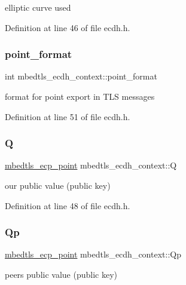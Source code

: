 elliptic curve used 

Definition at line 46 of file ecdh.\+h.

\mbox{\label{structmbedtls__ecdh__context_ae7ae7b0231e898b0d973df360aea8f17}} 
\subsubsection{\texorpdfstring{point\+\_\+format}{point\_format}}
{\footnotesize\ttfamily int mbedtls\+\_\+ecdh\+\_\+context\+::point\+\_\+format}

format for point export in T\+LS messages 

Definition at line 51 of file ecdh.\+h.

\mbox{\label{structmbedtls__ecdh__context_af2657e12e87be5b3e73bcf1ea2941d0b}} 
\subsubsection{\texorpdfstring{Q}{Q}}
{\footnotesize\ttfamily \mbox{\hyperlink{structmbedtls__ecp__point}{mbedtls\+\_\+ecp\+\_\+point}} mbedtls\+\_\+ecdh\+\_\+context\+::Q}

our public value (public key) 

Definition at line 48 of file ecdh.\+h.

\mbox{\label{structmbedtls__ecdh__context_a64ecde7d95dcc725d6af5f8e3ce542ca}} 
\subsubsection{\texorpdfstring{Qp}{Qp}}
{\footnotesize\ttfamily \mbox{\hyperlink{structmbedtls__ecp__point}{mbedtls\+\_\+ecp\+\_\+point}} mbedtls\+\_\+ecdh\+\_\+context\+::\+Qp}

peer\textquotesingle{}s public value (public key) 

